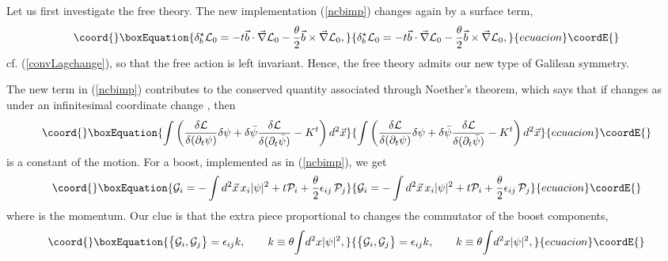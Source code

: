 \documentclass[a4paper,11pt]{article}
\def\p{{\partial}}
\def\vb{{\vec b}}
\def\vx{{\vec x}}
\def\vnabla{{\vec\nabla}}
\begin{document}
Let us first investigate the free theory.
The new implementation (\ref{ncbimp})
changes \coordHE{} again by a surface term,
\begin{equation}\coord{}\boxEquation{
     \delta^{\star}_{b}{\cal L}_{0}=-t\vb\cdot\vnabla{\cal L}_{0}-
\frac{\theta}{2}\vb\times\vnabla{\cal L}_{0},
\label{newfreeactchange}
}{
     \delta^{\star}_{b}{\cal L}_{0}=-t\vb\cdot\vnabla{\cal L}_{0}-
\frac{\theta}{2}\vb\times\vnabla{\cal L}_{0},
}{ecuacion}\coordE{}\end{equation}
cf. (\ref{convLagchange}), so that the free action \coordHE{} is left invariant.
Hence, the free theory admits our new type
of Galilean symmetry.

The new term in (\ref{ncbimp}) contributes
to the conserved quantity associated through
Noether's theorem, which says that
if \coordHE{} changes as
\myHighlight{$\delta{\cal L}=\p_{\alpha}K^{\alpha}$}\coordHE{} under an
infinitesimal coordinate change \myHighlight{$\delta \vx$}\coordHE{}, then
\begin{equation}\coord{}\boxEquation{
   \int\left(\frac{\delta{\cal L}}{\delta(\p_{t}\psi)}\delta\psi
  +\delta\bar{\psi}\frac{\delta{\cal L}}{\delta(\p_{t}\bar{\psi})}
     -K^{t}\right)d^2\vx
\label{Noether}
}{
   \int\left(\frac{\delta{\cal L}}{\delta(\p_{t}\psi)}\delta\psi
  +\delta\bar{\psi}\frac{\delta{\cal L}}{\delta(\p_{t}\bar{\psi})}
     -K^{t}\right)d^2\vx
}{ecuacion}\coordE{}\end{equation}
is a constant of the motion.
For a boost, implemented as in (\ref{ncbimp}), we get
\begin{equation}\coord{}\boxEquation{
     {\cal G}_{i}=-\int d^2\vx\,x_{i}\vert\psi\vert^2
     +t{\cal P}_{i}
     +\frac{\theta}{2}\epsilon_{ij}\,{\cal P}_{j}
     \label{exoboost}
}{
     {\cal G}_{i}=-\int d^2\vx\,x_{i}\vert\psi\vert^2
     +t{\cal P}_{i}
     +\frac{\theta}{2}\epsilon_{ij}\,{\cal P}_{j}
     }{ecuacion}\coordE{}\end{equation}
where
\myHighlight{${\cal P}_{i}=-i\displaystyle\int d^2x\bar{\psi}\p_{i}\psi$}\coordHE{}
is the momentum.
Our clue is that the extra piece proportional to \myHighlight{$\theta$}\coordHE{} changes the
commutator of the boost components,
\begin{equation}\coord{}\boxEquation{
     \big\{{\cal G}_{i},{\cal G}_{j}\big\}=\epsilon_{ij}k,
     \qquad
     k\equiv
     \theta\!\int\! d^2x\vert\psi\vert^2,
     \label{exoticcharge}
}{
     \big\{{\cal G}_{i},{\cal G}_{j}\big\}=\epsilon_{ij}k,
     \qquad
     k\equiv
     \theta\!\int\! d^2x\vert\psi\vert^2,
     }{ecuacion}\coordE{}\end{equation}
\end{document}

